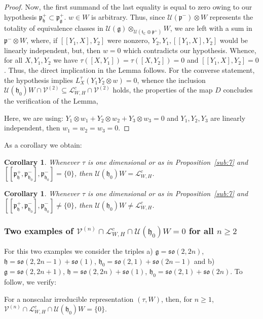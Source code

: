 \documentclass[12pt]{amsart}
\newtheorem{cor}[thm]{Corollary}
\theoremstyle{definition}
\theoremstyle{remark}
\newcommand{\g}{\mathfrak{g}}
\newcommand{\h}{\mathfrak{h}}
\newcommand{\p}{\mathfrak p}
\renewcommand{\t}{{\mathfrak t}}
\newcommand{\C}{{\mathbb C}}
\numberwithin{equation}{section}
\begin{document}
\begin{proof}
 Now, the first summand of the last equality
is equal to zero
owing to our hypothesis $\p_\h^+ \subset \p_\g^+ $. $ w \in  W$ is arbitrary.
  Thus,    since $\mathcal U(\p^-) \otimes W$ represents the totality of equivalence  classes in
$\mathcal U(\g) \otimes_{\mathcal U(\t_\C \oplus \p^+)}   W $,  we are left
with a sum in $\p^- \otimes W$, where, if $[[Y_1,X],Y_2]$   were nonzero,
$Y_2,Y_1, [[Y_1,X],Y_2]$ would be  linearly
independent, but, then $w=0$ which contradicts our hypothesis.
 Whence,
for all $X,Y_1,Y_2$ we have $\tau([X,Y_1])= \tau([X,Y_2])=0$ and $ [[Y_1,X],Y_2]=0$.
Thus, the direct implication in the Lemma follows. For the converse statement, the hypothesis implies
$L_X^\tau(Y_1Y_2\otimes w)=0$, whence the inclusion $\mathcal U(\h_0)W \cap \mathcal V^{(2)}
   \subseteq \mathcal L_{W,H}^c\cap \mathcal V^{(2)}$ holds, the properties of the map $D$ \cite{OV3}
    concludes the  verification of the Lemma,

     Here, we are using: $Y_1\otimes w_1 +  Y_2\otimes w_2 + Y_3\otimes w_3=0$ and $Y_1,Y_2,Y_3$ are
linearly independent, then $w_1=w_2=w_3 =0$. \end{proof}
As a corollary we obtain:
\begin{cor}Whenever $\tau$ is one dimensional or as in Proposition~\ref{sub:7} and
 $[[\p_\h^+, \p_{\h_0}^- ], \p_{\h_0}^- ]=\{0\}$, then $\mathcal U(\h_0)W
   =\mathcal L_{W,H}^c $.
\end{cor}
 \begin{cor}Whenever $\tau$ is one dimensional or as in Proposition~\ref{sub:7} and
 $[[\p_\h^+, \p_{\h_0}^- ], \p_{\h_0}^- ]\not=\{0\}$, then $\mathcal U(\h_0)W
   \not=\mathcal L_{W,H}^c $.
\end{cor}



\subsubsection{Two  examples of $\mathcal V^{(n)}\cap \mathcal L_{W,H}^c \cap \mathcal U(\h_0)W=0 $ for all $n\geq 2 $}\label{:sub:twoexam} For this two examples we consider the triples a) $\g=\mathfrak{so}(2,2n)$, $\h=\mathfrak{so}(2,2n-1)+\mathfrak{so}(1)$, $\h_0= \mathfrak{so}(2,1)+\mathfrak{so}( 2n-1)$ and b)  $\g=\mathfrak{so}(2,2n+1)$, $\h=\mathfrak{so}(2,2n)+\mathfrak{so}(1)$, $\h_0=\mathfrak{so}(2,1)+\mathfrak{so}(2n)$. To follow, we verify:

For a nonscalar irreducible representation $(\tau, W)$, then,  for $n\geq 1$,   $\mathcal V^{(n)}\cap \mathcal L_{W,H}^c \cap \mathcal U(\h_0)W= \{0\}$.
\end{document}
